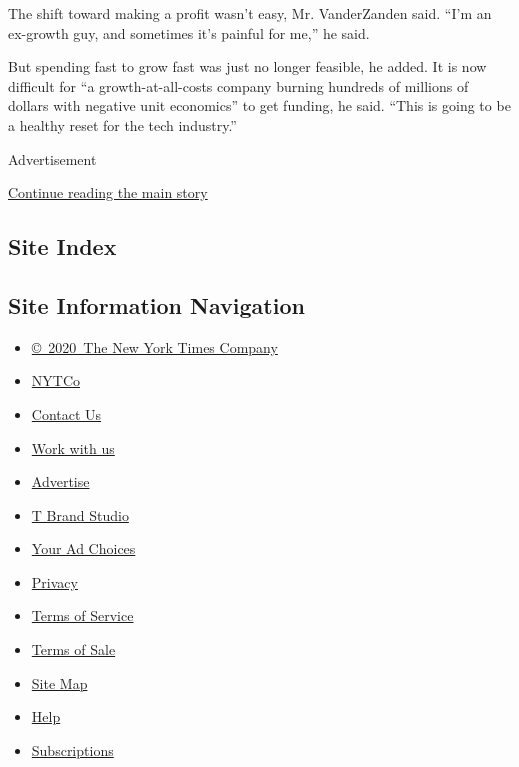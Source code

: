 The shift toward making a profit wasn't easy, Mr. VanderZanden said.
``I'm an ex-growth guy, and sometimes it's painful for me,'' he said.

But spending fast to grow fast was just no longer feasible, he added. It
is now difficult for ``a growth-at-all-costs company burning hundreds of
millions of dollars with negative unit economics'' to get funding, he
said. ``This is going to be a healthy reset for the tech industry.''

Advertisement

\protect\hyperlink{after-bottom}{Continue reading the main story}

\hypertarget{site-index}{%
\subsection{Site Index}\label{site-index}}

\hypertarget{site-information-navigation}{%
\subsection{Site Information
Navigation}\label{site-information-navigation}}

\begin{itemize}
\tightlist
\item
  \href{https://help.nytimes3xbfgragh.onion/hc/en-us/articles/115014792127-Copyright-notice}{©~2020~The
  New York Times Company}
\end{itemize}

\begin{itemize}
\tightlist
\item
  \href{https://www.nytco.com/}{NYTCo}
\item
  \href{https://help.nytimes3xbfgragh.onion/hc/en-us/articles/115015385887-Contact-Us}{Contact
  Us}
\item
  \href{https://www.nytco.com/careers/}{Work with us}
\item
  \href{https://nytmediakit.com/}{Advertise}
\item
  \href{http://www.tbrandstudio.com/}{T Brand Studio}
\item
  \href{https://www.nytimes3xbfgragh.onion/privacy/cookie-policy\#how-do-i-manage-trackers}{Your
  Ad Choices}
\item
  \href{https://www.nytimes3xbfgragh.onion/privacy}{Privacy}
\item
  \href{https://help.nytimes3xbfgragh.onion/hc/en-us/articles/115014893428-Terms-of-service}{Terms
  of Service}
\item
  \href{https://help.nytimes3xbfgragh.onion/hc/en-us/articles/115014893968-Terms-of-sale}{Terms
  of Sale}
\item
  \href{https://spiderbites.nytimes3xbfgragh.onion}{Site Map}
\item
  \href{https://help.nytimes3xbfgragh.onion/hc/en-us}{Help}
\item
  \href{https://www.nytimes3xbfgragh.onion/subscription?campaignId=37WXW}{Subscriptions}
\end{itemize}
